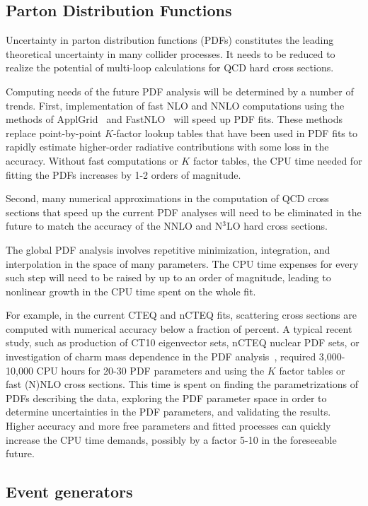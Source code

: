 \subsection{Parton Distribution Functions}

Uncertainty in parton distribution functions (PDFs) constitutes the
leading theoretical uncertainty in many collider processes. It needs
to be reduced to realize the potential of multi-loop calculations for
QCD hard cross sections.

Computing needs of the future PDF analysis will be determined by a
number of trends.  First, implementation of fast NLO and NNLO
computations using the methods of ApplGrid~\cite{Carli:2010rw} 
and FastNLO~\cite{Kluge:2006xs} will speed up
PDF fits. These methods replace point-by-point $K$-factor lookup tables that
have been used in PDF fits to rapidly estimate higher-order radiative
contributions with some loss in the accuracy.  Without fast
computations or $K$ factor tables, the CPU time needed for fitting the PDFs
increases by 1-2 orders of magnitude.

Second, many numerical approximations in the computation of QCD cross
sections that speed up the current PDF analyses will need to be
eliminated in the future to match the accuracy of the NNLO and N$^3$LO
hard cross sections.

The global PDF analysis involves repetitive minimization, integration,
and interpolation in the space of many parameters.  The CPU time expenses
for every such step will need to be raised by up to an order of
magnitude, leading to nonlinear growth in the CPU time spent on the whole fit.

For example, in the current CTEQ and nCTEQ fits, scattering cross
sections are computed with numerical accuracy below a fraction of
percent. A typical recent study, such as production of
CT10 eigenvector sets, nCTEQ nuclear PDF sets, or investigation 
of charm mass dependence in the PDF analysis~\cite{Gao:2013wwa,
 Gao:2013xoa,Schienbein:2009kk}, required  3,000-10,000 CPU hours 
for 20-30 PDF parameters and using the $K$ factor
tables or fast (N)NLO cross sections. This time is spent on finding
the parametrizations of PDFs describing the data,
exploring the PDF parameter space in order to determine uncertainties
in the PDF parameters, and validating the results. Higher accuracy and
more free parameters and fitted processes can quickly increase the
CPU time demands, possibly by a factor 5-10 in the foreseeable future.

\subsection{Event generators}

